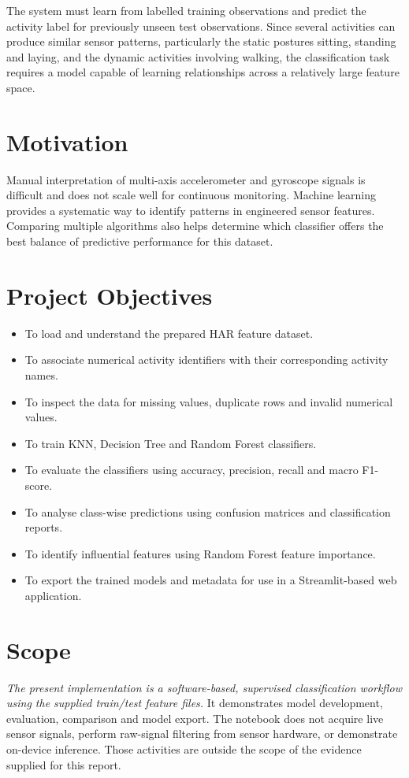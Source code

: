 The system must learn from labelled training observations and predict the activity label for previously unseen test observations. Since several activities can produce similar sensor patterns, particularly the static postures sitting, standing and laying, and the dynamic activities involving walking, the classification task requires a model capable of learning relationships across a relatively large feature space.

\section{Motivation}
Manual interpretation of multi-axis accelerometer and gyroscope signals is difficult and does not scale well for continuous monitoring. Machine learning provides a systematic way to identify patterns in engineered sensor features. Comparing multiple algorithms also helps determine which classifier offers the best balance of predictive performance for this dataset.

\section{Project Objectives}
\begin{itemize}
\item To load and understand the prepared HAR feature dataset.
\item To associate numerical activity identifiers with their corresponding activity names.
\item To inspect the data for missing values, duplicate rows and invalid numerical values.
\item To train KNN, Decision Tree and Random Forest classifiers.
\item To evaluate the classifiers using accuracy, precision, recall and macro F1-score.
\item To analyse class-wise predictions using confusion matrices and classification reports.
\item To identify influential features using Random Forest feature importance.
\item To export the trained models and metadata for use in a Streamlit-based web application.
\end{itemize}

\section{Scope}
\emph{The present implementation is a software-based, supervised classification workflow using the supplied train/test feature files.} It demonstrates model development, evaluation, comparison and model export. The notebook does not acquire live sensor signals, perform raw-signal filtering from sensor hardware, or demonstrate on-device inference. Those activities are outside the scope of the evidence supplied for this report.

